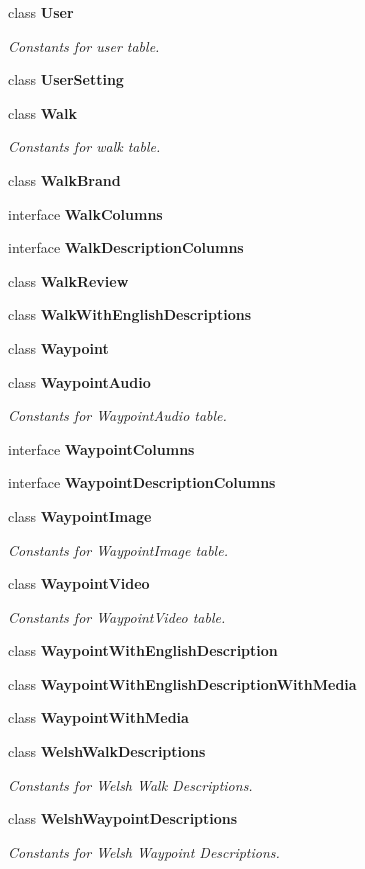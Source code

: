 \begin{DoxyCompactItemize}
\item 
class {\bfseries User}
\begin{DoxyCompactList}\small\item\em Constants for user table. \end{DoxyCompactList}\item 
class {\bfseries User\+Setting}
\item 
class {\bfseries Walk}
\begin{DoxyCompactList}\small\item\em Constants for walk table. \end{DoxyCompactList}\item 
class {\bfseries Walk\+Brand}
\item 
interface {\bfseries Walk\+Columns}
\item 
interface {\bfseries Walk\+Description\+Columns}
\item 
class {\bfseries Walk\+Review}
\item 
class {\bfseries Walk\+With\+English\+Descriptions}
\item 
class {\bfseries Waypoint}
\item 
class {\bfseries Waypoint\+Audio}
\begin{DoxyCompactList}\small\item\em Constants for Waypoint\+Audio table. \end{DoxyCompactList}\item 
interface {\bfseries Waypoint\+Columns}
\item 
interface {\bfseries Waypoint\+Description\+Columns}
\item 
class {\bfseries Waypoint\+Image}
\begin{DoxyCompactList}\small\item\em Constants for Waypoint\+Image table. \end{DoxyCompactList}\item 
class {\bfseries Waypoint\+Video}
\begin{DoxyCompactList}\small\item\em Constants for Waypoint\+Video table. \end{DoxyCompactList}\item 
class {\bfseries Waypoint\+With\+English\+Description}
\item 
class {\bfseries Waypoint\+With\+English\+Description\+With\+Media}
\item 
class {\bfseries Waypoint\+With\+Media}
\item 
class {\bfseries Welsh\+Walk\+Descriptions}
\begin{DoxyCompactList}\small\item\em Constants for Welsh Walk Descriptions. \end{DoxyCompactList}\item 
class {\bfseries Welsh\+Waypoint\+Descriptions}
\begin{DoxyCompactList}\small\item\em Constants for Welsh Waypoint Descriptions. \end{DoxyCompactList}\end{DoxyCompactItemize}
